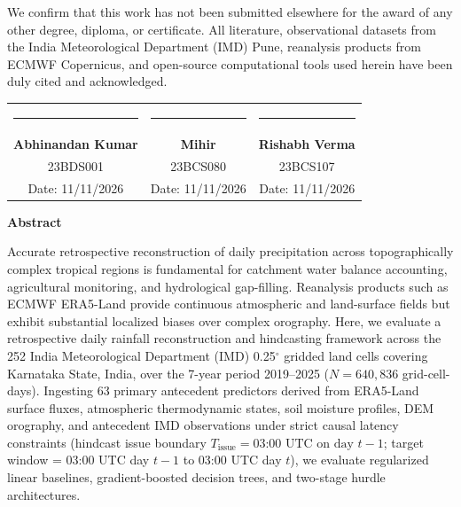 \documentclass[12pt]{article}
\begin{document}
\vspace{0.8cm}
\noindent We confirm that this work has not been submitted elsewhere for the award of any other degree, diploma, or certificate. All literature, observational datasets from the India Meteorological Department (IMD) Pune, reanalysis products from ECMWF Copernicus, and open-source computational tools used herein have been duly cited and acknowledged.

\vspace{2.5cm}

\noindent\begin{tabular*}{\textwidth}{@{\extracolsep{\fill}}ccc}
\rule{4.5cm}{0.4pt} & \rule{4.5cm}{0.4pt} & \rule{4.5cm}{0.4pt} \\
\textbf{Abhinandan Kumar} & \textbf{Mihir} & \textbf{Rishabh Verma} \\
23BDS001 & 23BCS080 & 23BCS107 \\
Date: 11/11/2026 & Date: 11/11/2026 & Date: 11/11/2026 \\
\end{tabular*}

\newpage
\thispagestyle{empty}

\begin{center}
	{\huge \textbf{Abstract}}\\[1.0cm]
\end{center}

\noindent Accurate retrospective reconstruction of daily precipitation across topographically complex tropical regions is fundamental for catchment water balance accounting, agricultural monitoring, and hydrological gap-filling. Reanalysis products such as ECMWF ERA5-Land provide continuous atmospheric and land-surface fields but exhibit substantial localized biases over complex orography. Here, we evaluate a retrospective daily rainfall reconstruction and hindcasting framework across the 252 India Meteorological Department (IMD) 0.25$^\circ$ gridded land cells covering Karnataka State, India, over the 7-year period 2019--2025 ($N = 640,836$ grid-cell-days). Ingesting 63 primary antecedent predictors derived from ERA5-Land surface fluxes, atmospheric thermodynamic states, soil moisture profiles, DEM orography, and antecedent IMD observations under strict causal latency constraints (hindcast issue boundary $T_{\text{issue}} = \text{03:00 UTC on day } t-1$; target window = 03:00 UTC day $t-1$ to 03:00 UTC day $t$), we evaluate regularized linear baselines, gradient-boosted decision trees, and two-stage hurdle architectures. 
\end{document}
